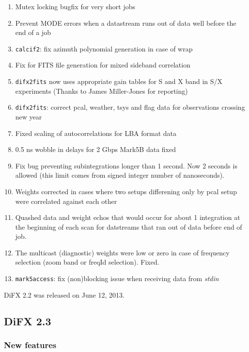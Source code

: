 \begin{enumerate}

\item Mutex locking bugfix for very short jobs
\item Prevent MODE errors when a datastream runs out of data well before the end of a job
\item {\tt calcif2}: fix azimuth polynomial generation in case of wrap
\item Fix for FITS file generation for mixed sideband correlation
\item {\tt difx2fits} now uses appropriate gain tables for S and X band in S/X experiments (Thanks to James Miller-Jones for reporting)
\item {\tt difx2fits}: correct pcal, weather, tsys and flag data for observations crossing new year
\item Fixed scaling of autocorrelations for LBA format data
\item 0.5 ns wobble in delays for 2 Gbps Mark5B data fixed
\item Fix bug preventing subintegrations longer than 1 second. Now 2 seconds is allowed (this limit comes from signed integer number of nanoseconds).
\item Weights corrected in cases where two setups differening only by pcal setup were correlated against each other
\item Quashed data and weight echos that would occur for about 1 integration at the beginning of each scan for datstreams that ran out of data before end of job.
\item The multicast (diagnostic) weights were low or zero in case of frequency selection (zoom band or freqId selection). Fixed.
\item {\tt mark5access}: fix (non)blocking issue when receiving data from {\em stdin}


\end{enumerate}


DiFX 2.2 was released on June 12, 2013.



\subsection{DiFX 2.3}

\subsubsection{New features}

